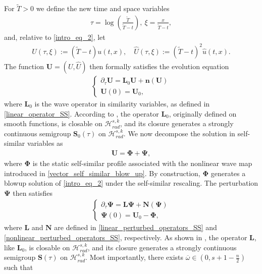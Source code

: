 \documentclass[12pt,reqno]{amsart}
\theoremstyle{plain}
\theoremstyle{remark}
\theoremstyle{plain}
\theoremstyle{definition}
\numberwithin{equation}{section}
\numberwithin{equation}{section}
\newcommand{\HH}{\mathcal{H}}
\begin{document}
    For $\tilde{T}>0$ we define the new time and space variables
	\begin{align*}
		\tau=\log\left(\frac{\tilde{T}}{\tilde{T}-t}\right),\ \xi=\frac{x}{\tilde{T}-t},
	\end{align*}
	and, relative to \eqref{intro_eq_2}, let
	\begin{align*}
		U(\tau,\xi):=(\tilde{T}-t)u(t,x),\quad \hat{U}(\tau,\xi):=(\tilde{T}-t)^2 \hat{u}(t,x).
	\end{align*}
	The function $\mathbf{U}=(U,\hat{U})$ then formally satisfies the evolution equation
	\begin{align}\label{wave_map_selfsimilar_variables}
		\begin{cases}
			\partial_\tau \mathbf{U}=\mathbf{L}_0 \mathbf{U}+\mathbf{n}(\mathbf{U})\\
			\mathbf{U}(0)=\mathbf{U}_0,
		\end{cases}
	\end{align}
	where $\mathbf{L}_0 $ is the wave operator in similarity variables, as defined in \eqref{linear_operator_SS}.
	According to \cite[Proposition 4.1]{glogic2025globally}, the operator $\mathbf{L}_0$, originally defined on smooth functions, is closable on $\HH_{rad}^{s,k}$, and its closure generates a strongly continuous semigroup $\mathbf{S}_0(\tau)$ on $\HH_{rad}^{s,k}$. 
    We now decompose the solution in self-similar variables as
    \begin{align*}
        \mathbf{U}=\mathbf{\Phi}+\mathbf{\Psi},
    \end{align*}
     where $\mathbf{\Phi}$ is the static self-similar profile associated with the nonlinear wave map introduced in \eqref{vector_self_similar_blow_up}. By construction, $\mathbf{\Phi}$ generates a blowup solution of \eqref{intro_eq_2} under the self-similar rescaling. The perturbation $\mathbf{\Psi}$ then satisfies
	\begin{align*}
		\begin{cases}
			\partial_\tau \mathbf{\Psi}=\mathbf{L} \mathbf{\Psi}+\mathbf{N}(\mathbf{\Psi})\\
			\mathbf{\Psi}(0)=\mathbf{U}_0-\mathbf{\Phi},
		\end{cases}
	\end{align*}
	where $\mathbf{L}$ and $\mathbf{N}$ are defined in \eqref{linear_perturbed_operators_SS} and \eqref{nonlinear_perturbed_operators_SS}, respectively.
	As shown in \cite[Sections 5–6]{glogic2025globally}, the operator $\mathbf{L}$, like $\mathbf{L}_0$, is closable on $\HH_{rad}^{s,k}$, and its closure generates a strongly continuous semigroup $\mathbf{S}(\tau)$ on $\HH_{rad}^{s,k}$. Most importantly, there exists $\overline{\omega}\in (0, s+1-\frac{n}{2})$ such that 
\end{document}
